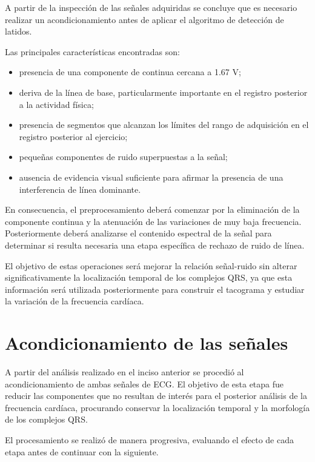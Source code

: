 \documentclass[12pt,a4paper]{article}
\begin{document}
A partir de la inspección de las señales adquiridas se concluye que es necesario
realizar un acondicionamiento antes de aplicar el algoritmo de detección de
latidos.

Las principales características encontradas son:

\begin{itemize}
    \item presencia de una componente de continua cercana a 1.67 V;
    \item deriva de la línea de base, particularmente importante en el registro
    posterior a la actividad física;
    \item presencia de segmentos que alcanzan los límites del rango de
    adquisición en el registro posterior al ejercicio;
    \item pequeñas componentes de ruido superpuestas a la señal;
    \item ausencia de evidencia visual suficiente para afirmar la presencia de
    una interferencia de línea dominante.
\end{itemize}

En consecuencia, el preprocesamiento deberá comenzar por la eliminación de la
componente continua y la atenuación de las variaciones de muy baja frecuencia.
Posteriormente deberá analizarse el contenido espectral de la señal para
determinar si resulta necesaria una etapa específica de rechazo de ruido de
línea.

El objetivo de estas operaciones será mejorar la relación señal-ruido sin
alterar significativamente la localización temporal de los complejos QRS, ya
que esta información será utilizada posteriormente para construir el tacograma
y estudiar la variación de la frecuencia cardíaca.



\section{Acondicionamiento de las señales}

A partir del análisis realizado en el inciso anterior se procedió al
acondicionamiento de ambas señales de ECG. El objetivo de esta etapa fue reducir
las componentes que no resultan de interés para el posterior análisis de la
frecuencia cardíaca, procurando conservar la localización temporal y la
morfología de los complejos QRS.

El procesamiento se realizó de manera progresiva, evaluando el efecto de cada
etapa antes de continuar con la siguiente.
\end{document}
